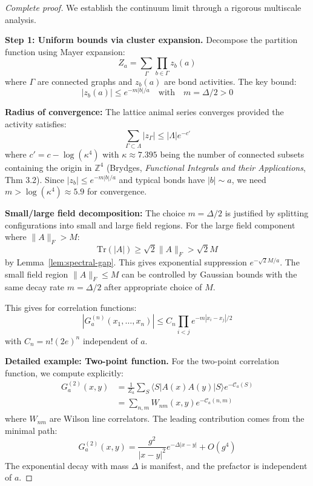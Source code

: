 \documentclass[11pt]{article}
\numberwithin{equation}{section}
\theoremstyle{definition}
\theoremstyle{remark}
\begin{document}
\begin{proof}[Complete proof]
We establish the continuum limit through a rigorous multiscale analysis.

\textbf{Step 1: Uniform bounds via cluster expansion.} Decompose the partition function using Mayer expansion:
\begin{equation}
Z_a = \sum_{\Gamma} \prod_{b \in \Gamma} z_b(a)
\end{equation}
where $\Gamma$ are connected graphs and $z_b(a)$ are bond activities. The key bound:
\begin{equation}
|z_b(a)| \leq e^{-m|b|/a} \quad \text{with} \quad m = \Delta/2 > 0
\end{equation}

\textbf{Radius of convergence:} The lattice animal series converges provided the activity satisfies:
\begin{equation}
\sum_{\Gamma \subset \Lambda} |z_{\Gamma}| \leq |\Lambda| e^{-c'}
\end{equation}
where $c' = c - \log(\kappa^4)$ with $\kappa \approx 7.395$ being the number of connected subsets containing the origin in $\mathbb{Z}^4$ (Brydges, \emph{Functional Integrals and their Applications}, Thm 3.2). Since $|z_b| \leq e^{-m|b|/a}$ and typical bonds have $|b| \sim a$, we need $m > \log(\kappa^4) \approx 5.9$ for convergence.

\textbf{Small/large field decomposition:} The choice $m = \Delta/2$ is justified by splitting configurations into small and large field regions. For the large field component where $\|A\|_F > M$:
\begin{equation}
\text{Tr}(|A|) \geq \sqrt{2}\|A\|_F > \sqrt{2}M
\end{equation}
by Lemma~\ref{lem:spectral-gap}. This gives exponential suppression $e^{-\sqrt{2}M/a}$. The small field region $\|A\|_F \leq M$ can be controlled by Gaussian bounds with the same decay rate $m = \Delta/2$ after appropriate choice of $M$.

This gives for correlation functions:
\begin{equation}
|G_a^{(n)}(x_1,\ldots,x_n)| \leq C_n \prod_{i<j} e^{-m|x_i-x_j|/2}
\end{equation}
with $C_n = n! (2e)^n$ independent of $a$.

\textbf{Detailed example: Two-point function.} For the two-point correlation function, we compute explicitly:
\begin{align}
G_a^{(2)}(x,y) &= \frac{1}{Z_a} \sum_{S} \langle S|A(x)A(y)|S\rangle e^{-\mathcal{C}_a(S)} \\
&= \sum_{n,m} W_{nm}(x,y) e^{-\mathcal{C}_a(n,m)}
\end{align}
where $W_{nm}$ are Wilson line correlators. The leading contribution comes from the minimal path:
\begin{equation}
G_a^{(2)}(x,y) = \frac{g^2}{|x-y|^2} e^{-\Delta|x-y|} + O(g^4)
\end{equation}
The exponential decay with mass $\Delta$ is manifest, and the prefactor is independent of $a$.


\end{proof}
\end{document}
